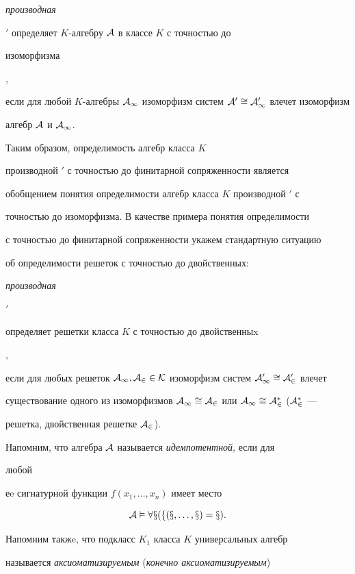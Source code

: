 {\it производная 


$'$ определяет $K$-алгебру $\cal A$ в классе $K$ с точностью до 


изоморфизма}, 


если для любой $K$-алгебры $\cal A_1$ изоморфизм систем $\cal 


A'\cong\cal A'_1$ влечет изоморфизм 


алгебр $\cal A$ и $\cal A_1$. 


 


Таким образом, определимость алгебр класса $K$ 


производной $'$ с точностью до финитарной сопряженности является 


обобщением понятия определимости алгебр класса $K$ производной $'$ с 


точностью до изоморфизма. В качестве примера понятия определимости 


с точностью до финитарной сопряженности укажем стандартную ситуацию 


об определимости решеток с точностью до двойственных: {\it производная 


$'$ 


определяет решетки класса $K$ с точностью до двойственныx}, 


если для любых решеток $\cal A_1,\cal A_2\in K$ изоморфизм систем $\cal 


A'_1\cong\cal A'_2$ влечет 


существование одного из изоморфизмов $\cal A_1\cong\cal A_2$ или $\cal 


A_1\cong\cal A^*_2$ ($\cal A^*_2$ --- 


решетка, двойственная решетке $\cal A_2$). 


 


Напомним, что алгебра $\cal A$ называется {\it идемпотентной}, если для 


любой 


еe сигнатурной функции $f(x_1,\dotsc,x_n)$ имеет место 


$$ 


\cal A\vDash\forall x(f(x,\dotsc,x)=x). 


$$ 


 


Напомним такжe, что подкласс $K_1$ класса $K$ универсальных алгебр 


называется {\it аксиоматизируемым} ({\it конечно аксиоматизируемым}) 


